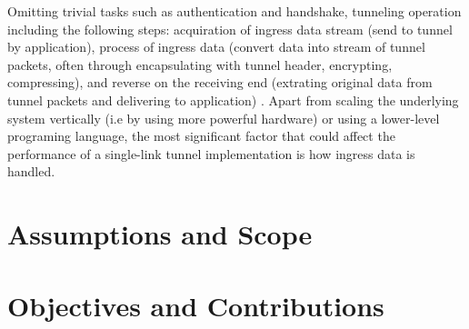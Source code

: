 

Omitting trivial tasks such as authentication and handshake, tunneling operation including the following steps: acquiration of ingress data stream (send to tunnel by application), process of ingress data (convert data into stream of tunnel packets, often through encapsulating with tunnel header, encrypting, compressing), and reverse on the receiving end (extrating original data from tunnel packets and delivering to application) .
Apart from scaling the underlying system vertically (i.e by using more powerful hardware) or using a lower-level programing language, the most significant factor that could affect the performance of a single-link tunnel implementation is how ingress data is handled.







\section{Assumptions and Scope}




\section{Objectives and Contributions}


